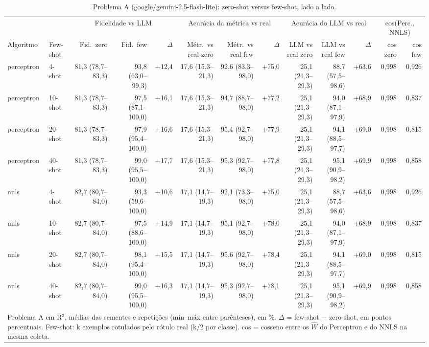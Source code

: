\begin{table}[htbp]
\centering
\footnotesize
\caption{Problema A (google/gemini-2.5-flash-lite): zero-shot versus few-shot, lado a lado.}
\label{tab:T6_zero_few_A_flashlite}
\begin{tabular}{llrrrrrrrrrrr}
\toprule
 &  & \multicolumn{3}{c}{Fidelidade vs LLM} & \multicolumn{3}{c}{Acurácia da métrica vs real} & \multicolumn{3}{c}{Acurácia do LLM vs real} & \multicolumn{2}{c}{cos(Perc., NNLS)} \\ \cmidrule(lr){3-5} \cmidrule(lr){6-8} \cmidrule(lr){9-11} \cmidrule(lr){12-13}
Algoritmo & Few-shot & Fid.\ zero & Fid.\ few & $\Delta$ & Métr.\ vs real zero & Métr.\ vs real few & $\Delta$ & LLM vs real zero & LLM vs real few & $\Delta$ & cos zero & cos few \\
\midrule
perceptron & 4-shot & 81,3 (78,7–83,3) & 93,8 (63,0–99,3) & +12,4 & 17,6 (15,3–21,3) & 92,6 (83,3–98,0) & +75,0 & 25,1 (21,3–29,3) & 88,7 (57,5–98,6) & +63,6 & 0,998 & 0,926 \\
perceptron & 10-shot & 81,3 (78,7–83,3) & 97,5 (87,1–100,0) & +16,1 & 17,6 (15,3–21,3) & 94,7 (88,7–98,0) & +77,2 & 25,1 (21,3–29,3) & 94,0 (87,1–97,9) & +68,9 & 0,998 & 0,837 \\
perceptron & 20-shot & 81,3 (78,7–83,3) & 97,9 (95,4–100,0) & +16,6 & 17,6 (15,3–21,3) & 95,4 (92,7–98,0) & +77,9 & 25,1 (21,3–29,3) & 94,1 (88,5–97,7) & +69,0 & 0,998 & 0,815 \\
perceptron & 40-shot & 81,3 (78,7–83,3) & 99,0 (95,5–100,0) & +17,7 & 17,6 (15,3–21,3) & 95,3 (92,7–98,0) & +77,8 & 25,1 (21,3–29,3) & 95,1 (90,9–98,2) & +69,9 & 0,998 & 0,858 \\
\midrule
nnls & 4-shot & 82,7 (80,7–84,0) & 93,3 (59,6–100,0) & +10,6 & 17,1 (14,7–19,3) & 92,1 (73,3–98,0) & +75,0 & 25,1 (21,3–29,3) & 88,7 (57,5–98,6) & +63,6 & 0,998 & 0,926 \\
nnls & 10-shot & 82,7 (80,7–84,0) & 97,5 (88,6–100,0) & +14,9 & 17,1 (14,7–19,3) & 95,1 (92,7–98,0) & +78,0 & 25,1 (21,3–29,3) & 94,0 (87,1–97,9) & +68,9 & 0,998 & 0,837 \\
nnls & 20-shot & 82,7 (80,7–84,0) & 98,1 (95,4–100,0) & +15,5 & 17,1 (14,7–19,3) & 95,6 (92,7–98,0) & +78,4 & 25,1 (21,3–29,3) & 94,1 (88,5–97,7) & +69,0 & 0,998 & 0,815 \\
nnls & 40-shot & 82,7 (80,7–84,0) & 99,0 (95,5–100,0) & +16,3 & 17,1 (14,7–19,3) & 95,3 (92,7–98,0) & +78,1 & 25,1 (21,3–29,3) & 95,1 (90,9–98,2) & +69,9 & 0,998 & 0,858 \\
\bottomrule
\multicolumn{13}{p{0.95\linewidth}}{\footnotesize Problema A em R$^2$, médias das sementes e repetições (mín–máx entre parênteses), em \%. $\Delta$ = few-shot $-$ zero-shot, em pontos percentuais. Few-shot: k exemplos rotulados pelo rótulo real (k/2 por classe). cos = cosseno entre os $\hat{W}$ do Perceptron e do NNLS na mesma coleta.} \\
\end{tabular}
\end{table}
